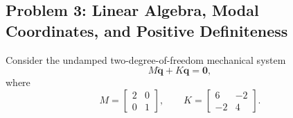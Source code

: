 \subsection*{Problem 3: Linear Algebra, Modal Coordinates, and Positive Definiteness}

Consider the undamped two-degree-of-freedom mechanical system
\begin{equation}
M\ddot{\mathbf{q}}
+
K\mathbf{q}
=
\mathbf{0},
\end{equation}
where
\begin{equation}
M=
\begin{bmatrix}
2&0\\
0&1
\end{bmatrix},
\qquad
K=
\begin{bmatrix}
6&-2\\
-2&4
\end{bmatrix}.
\end{equation}

